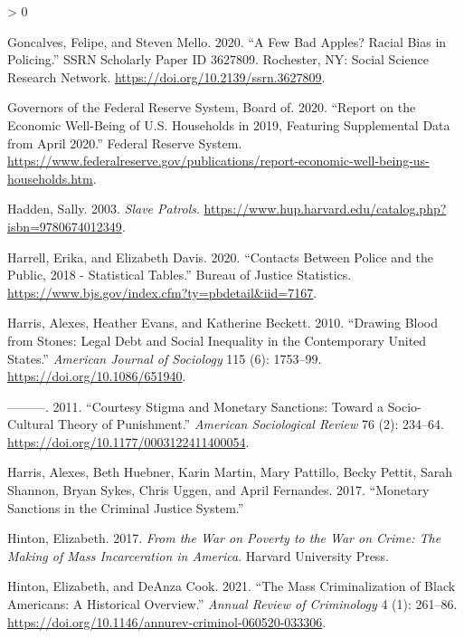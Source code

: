 \documentclass[
  12pt,
]{article}
\newlength{\cslhangindent}
\newenvironment{CSLReferences}[2] %
 {%
  \setlength{\parindent}{0pt}
  \ifodd #1 \everypar{\setlength{\hangindent}{\cslhangindent}}\ignorespaces\fi
  \ifnum #2 > 0
  \setlength{\parskip}{#2\baselineskip}
  \fi
 }%
 {}
\begin{document}
\begin{CSLReferences}{1}{0}
\leavevmode\hypertarget{ref-Goncalves2020}{}%
Goncalves, Felipe, and Steven Mello. 2020. {``A {Few Bad Apples}? {Racial Bias} in {Policing}.''} SSRN Scholarly Paper ID 3627809. {Rochester, NY}: {Social Science Research Network}. \url{https://doi.org/10.2139/ssrn.3627809}.

\leavevmode\hypertarget{ref-BoardofGovernorsoftheFederalReserveSystem2020}{}%
Governors of the Federal Reserve System, Board of. 2020. {``Report on the {Economic Well}-{Being} of {U}.{S}. {Households} in 2019, {Featuring Supplemental Data} from {April} 2020.''} {Federal Reserve System}. \url{https://www.federalreserve.gov/publications/report-economic-well-being-us-households.htm}.

\leavevmode\hypertarget{ref-Hadden2003}{}%
Hadden, Sally. 2003. \emph{Slave {Patrols}}. \url{https://www.hup.harvard.edu/catalog.php?isbn=9780674012349}.

\leavevmode\hypertarget{ref-Harrell2020}{}%
Harrell, Erika, and Elizabeth Davis. 2020. {``Contacts {Between Police} and the {Public}, 2018 - {Statistical Tables}.''} {Bureau of Justice Statistics}. \url{https://www.bjs.gov/index.cfm?ty=pbdetail\&iid=7167}.

\leavevmode\hypertarget{ref-Harris2010}{}%
Harris, Alexes, Heather Evans, and Katherine Beckett. 2010. {``Drawing {Blood} from {Stones}: {Legal Debt} and {Social Inequality} in the {Contemporary United States}.''} \emph{American Journal of Sociology} 115 (6): 1753--99. \url{https://doi.org/10.1086/651940}.

\leavevmode\hypertarget{ref-Harris2011}{}%
---------. 2011. {``Courtesy {Stigma} and {Monetary Sanctions}: {Toward} a {Socio}-{Cultural Theory} of {Punishment}.''} \emph{American Sociological Review} 76 (2): 234--64. \url{https://doi.org/10.1177/0003122411400054}.

\leavevmode\hypertarget{ref-Harris2017}{}%
Harris, Alexes, Beth Huebner, Karin Martin, Mary Pattillo, Becky Pettit, Sarah Shannon, Bryan Sykes, Chris Uggen, and April Fernandes. 2017. {``Monetary {Sanctions} in the {Criminal Justice System}.''}

\leavevmode\hypertarget{ref-Hinton2017}{}%
Hinton, Elizabeth. 2017. \emph{From the {War} on {Poverty} to the {War} on {Crime}: {The Making} of {Mass Incarceration} in {America}}. {Harvard University Press}.

\leavevmode\hypertarget{ref-Hinton2021}{}%
Hinton, Elizabeth, and DeAnza Cook. 2021. {``The {Mass Criminalization} of {Black Americans}: {A Historical Overview}.''} \emph{Annual Review of Criminology} 4 (1): 261--86. \url{https://doi.org/10.1146/annurev-criminol-060520-033306}.


\end{CSLReferences}
\end{document}
